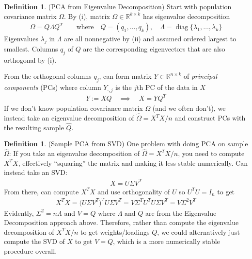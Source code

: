 \documentclass[12pt]{article}
\numberwithin{equation}{section} %
\theoremstyle{plain}
\theoremstyle{definition}
\newtheorem{defn}[thm]{Definition}
\theoremstyle{remark}
\newcommand{\diag}{\operatorname{diag}}
\newcommand{\R}{\mathbb{R}}
\begin{document}
\begin{defn}(PCA from Eigenvalue Decomposition)
Start with population covariance matrix $\Omega$.  By (i), matrix
$\Omega\in\R^{k\times k}$ has eigenvalue decomposition
\begin{align*}
  \Omega = Q\Lambda Q^T
  \qquad\text{where}\quad
  Q=(q_1,\ldots,q_k),
  \quad \Lambda = \diag\{\lambda_1,\ldots,\lambda_k\}
\end{align*}
Eigenvalues $\lambda_j$ in $\Lambda$ are all nonnegative by (ii) and
assumed ordered largest to smallest.
Columns $q_j$ of $Q$ are the corresponding eigenvectors that are also
orthogonal by (i).

From the orthogonal columns $q_j$, can form matrix $Y\in\R^{n\times k}$
of \emph{principal components} (PCs) where column $Y_{\cdot,j}$ is the
$j$th PC of the data in $X$
\begin{align}
  Y := XQ
  \quad\implies\quad
  X = YQ^T
  \label{PCA}
\end{align}
If we don't know population covariance matrix $\Omega$ (and we often
don't), we instead take an eigenvalue decomposition of
$\hat{\Omega}=X^TX/n$ and construct PCs with the resulting sample
$\hat{Q}$.
\end{defn}


\begin{defn}(Sample PCA from SVD)
One problem with doing PCA on sample $\hat{\Omega}$:
If you take an eigenvalue decomposition of $\hat{\Omega}=X^TX/n$, you
need to compute $X^TX$, effectively ``squaring'' the matrix and making
it less stable numerically. Can instead take an SVD:
\begin{align*}
  X = U\Sigma V^T
\end{align*}
From there, can compute $X^TX$ and use orthogonality of $U$ so
$U^TU=I_n$ to get
\begin{align*}
  X^TX
  = \big(U\Sigma V^T\big)^TU\Sigma V^T
  = V\Sigma^T U^TU\Sigma V^T
  = V\Sigma^2 V^T
\end{align*}
Evidently, $\Sigma^2=n\Lambda$ and $V=Q$ where $\Lambda$ and $Q$ are
from the Eigenvalue Decomposition approach above. Therefore, rather than
compute the eigenvalue decomposition of $X^TX/n$ to get weights/loadings
$Q$, we could alternatively just compute the SVD of $X$ to get $V=Q$,
which is a more numerically stable procedure overall.
\end{defn}
\end{document}
